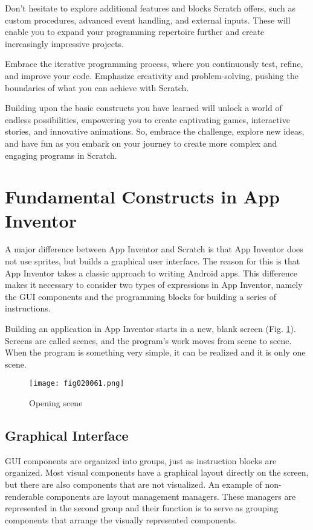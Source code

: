 Don't hesitate to explore additional features and blocks Scratch offers, such as custom procedures, advanced event handling, and external inputs. These will enable you to expand your programming repertoire further and create increasingly impressive projects.

Embrace the iterative programming process, where you continuously test, refine, and improve your code. Emphasize creativity and problem-solving, pushing the boundaries of what you can achieve with Scratch.

Building upon the basic constructs you have learned will unlock a world of endless possibilities, empowering you to create captivating games, interactive stories, and innovative animations. So, embrace the challenge, explore new ideas, and have fun as you embark on your journey to create more complex and engaging programs in Scratch.

\section{Fundamental Constructs in App Inventor}

A major difference between App Inventor and Scratch is that App Inventor does not use sprites, but builds a graphical user interface. The reason for this is that App Inventor takes a classic approach to writing Android apps. This difference makes it necessary to consider two types of expressions in App Inventor, namely the GUI components and the programming blocks for building a series of instructions.

Building an application in App Inventor starts in a new, blank screen (Fig. \ref{fig020061}). Screens are called scenes, and the program's work moves from scene to scene. When the program is something very simple, it can be realized and it is only one scene.

\begin{figure}[H]
   \centering
   \texttt{[image: fig020061.png]}
   \caption{Opening scene}
\label{fig020061}
\end{figure}

\subsection{Graphical Interface}

GUI components are organized into groups, just as instruction blocks are organized. Most visual components have a graphical layout directly on the screen, but there are also components that are not visualized. An example of non-renderable components are layout management managers. These managers are represented in the second group and their function is to serve as grouping components that arrange the visually represented components.

